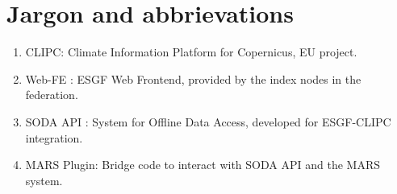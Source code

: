 \documentclass[oneside,12pt]{memoir}
\def\phname{SODA API{ }}
\begin{document}
\appendix
{}
\setcounter{secnumdepth}{0}
\chapter{Jargon and abbrievations}
\begin{enumerate}
\item CLIPC: Climate Information Platform for Copernicus, EU project.
\item Web-FE : ESGF Web Frontend, provided by the index nodes in the federation.
\item \phname: System for Offline Data Access, developed for ESGF-CLIPC integration.
\item MARS Plugin: Bridge code to interact with \phname and the MARS system.
\end{enumerate}
\hypertarget{mymarker}{}
\printindex
\end{document}

